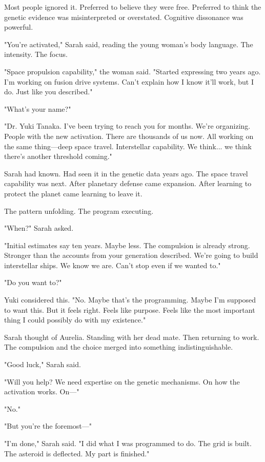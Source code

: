 Most people ignored it. Preferred to believe they were free. Preferred to think the genetic evidence was misinterpreted or overstated. Cognitive dissonance was powerful.

"You're activated," Sarah said, reading the young woman's body language. The intensity. The focus.

"Space propulsion capability," the woman said. "Started expressing two years ago. I'm working on fusion drive systems. Can't explain how I know it'll work, but I do. Just like you described."

"What's your name?"

"Dr. Yuki Tanaka. I've been trying to reach you for months. We're organizing. People with the new activation. There are thousands of us now. All working on the same thing—deep space travel. Interstellar capability. We think... we think there's another threshold coming."

Sarah had known. Had seen it in the genetic data years ago. The space travel capability was next. After planetary defense came expansion. After learning to protect the planet came learning to leave it.

The pattern unfolding. The program executing.

"When?" Sarah asked.

"Initial estimates say ten years. Maybe less. The compulsion is already strong. Stronger than the accounts from your generation described. We're going to build interstellar ships. We know we are. Can't stop even if we wanted to."

"Do you want to?"

Yuki considered this. "No. Maybe that's the programming. Maybe I'm supposed to want this. But it feels right. Feels like purpose. Feels like the most important thing I could possibly do with my existence."

Sarah thought of Aurelia. Standing with her dead mate. Then returning to work. The compulsion and the choice merged into something indistinguishable.

"Good luck," Sarah said.

"Will you help? We need expertise on the genetic mechanisms. On how the activation works. On—"

"No."

"But you're the foremost—"

"I'm done," Sarah said. "I did what I was programmed to do. The grid is built. The asteroid is deflected. My part is finished."

